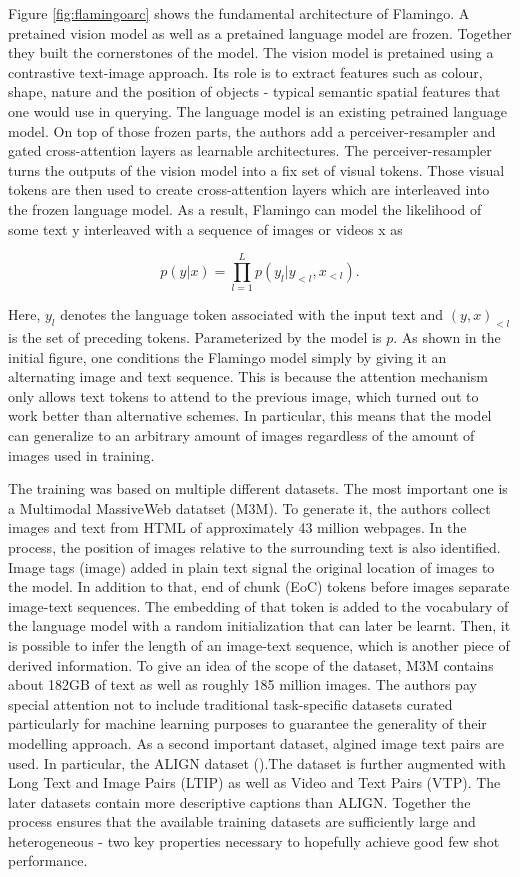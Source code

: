 \documentclass[
]{krantz}
\begin{document}
Figure \ref{fig:flamingoarc} shows the fundamental architecture of Flamingo.
A pretained vision model as well as a pretained language model are frozen. Together they built the cornerstones of the model. The vision model is pretained using a contrastive text-image approach. Its role is to extract
features such as colour, shape, nature and the position of objects - typical semantic spatial features that one would use in querying. The language model is an existing petrained language model. On top of those frozen
parts, the authors add a perceiver-resampler and gated cross-attention layers as learnable architectures. The perceiver-resampler turns the outputs of the vision model into a fix set of visual tokens. Those visual tokens are then used to create cross-attention layers which are interleaved into the frozen language model.
As a result, Flamingo can model the likelihood of some text y interleaved with a sequence of images or videos x as

\[ p(y|x) = \prod_{l=1}^{L} p(y_l | y_{<l}, x_{<l}) .\]

Here, \(y_l\) denotes the language token associated with the input text and \((y,x)_{<l}\) is the set of preceding tokens. Parameterized by the model is \(p\). As shown in the initial figure, one conditions the Flamingo model
simply by giving it an alternating image and text sequence. This is because the attention mechanism only allows text tokens to attend to the previous image, which turned out to work better than alternative schemes. In particular,
this means that the model can generalize to an arbitrary amount of images regardless of the amount of images used in training.

The training was based on multiple different datasets.
The most important one is a Multimodal MassiveWeb datatset (M3M). To generate it, the authors collect images and text from HTML of approximately 43 million webpages. In the process, the position of images relative to the surrounding
text is also identified. Image tags (image) added in plain text signal the original location of images to the model. In addition to that, end of chunk (EoC) tokens before images separate image-text sequences. The embedding of that token is added to the vocabulary of the language model with a random initialization that can later be learnt. Then, it is possible to infer the length of an image-text sequence, which is another piece of derived information.
To give an idea of the scope of the dataset, M3M contains about 182GB of text as well as roughly 185 million images.
The authors pay special attention not to include traditional task-specific datasets curated particularly for machine learning purposes to guarantee the generality of their modelling approach.
As a second important dataset, algined image text pairs are used. In particular, the ALIGN dataset (\citet{jia2021scaling}).The dataset is further augmented with Long Text and Image Pairs (LTIP) as well as Video and Text Pairs (VTP).
The later datasets contain more descriptive captions than ALIGN. Together the process ensures that the available training datasets are sufficiently large and heterogeneous - two key properties necessary to hopefully achieve good few shot performance.
\end{document}
